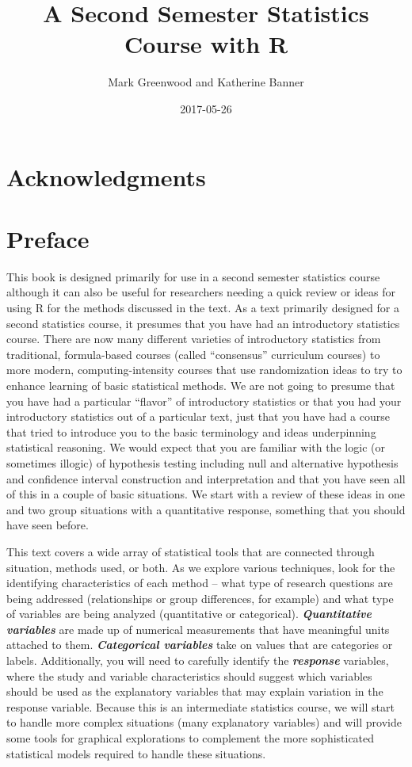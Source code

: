 \documentclass[]{book}
\title{A Second Semester Statistics Course with R}
\author{Mark Greenwood and Katherine Banner}
\date{2017-05-26}
\begin{document}
\maketitle

{
\setcounter{tocdepth}{1}
\tableofcontents
}
\chapter*{Acknowledgments}\label{acknowledgments}

\chapter{Preface}\label{preface}

This book is designed primarily for use in a second semester statistics
course although it can also be useful for researchers needing a quick
review or ideas for using R for the methods discussed in the text. As a
text primarily designed for a second statistics course, it presumes that
you have had an introductory statistics course. There are now many
different varieties of introductory statistics from traditional,
formula-based courses (called ``consensus'' curriculum courses) to more
modern, computing-intensity courses that use randomization ideas to try
to enhance learning of basic statistical methods. We are not going to
presume that you have had a particular ``flavor'' of introductory
statistics or that you had your introductory statistics out of a
particular text, just that you have had a course that tried to introduce
you to the basic terminology and ideas underpinning statistical
reasoning. We would expect that you are familiar with the logic (or
sometimes illogic) of hypothesis testing including null and alternative
hypothesis and confidence interval construction and interpretation and
that you have seen all of this in a couple of basic situations. We start
with a review of these ideas in one and two group situations with a
quantitative response, something that you should have seen before.

This text covers a wide array of statistical tools that are connected
through situation, methods used, or both. As we explore various
techniques, look for the identifying characteristics of each method --
what type of research questions are being addressed (relationships or
group differences, for example) and what type of variables are being
analyzed (quantitative or categorical). \textbf{\emph{Quantitative
variables}} are made up of numerical measurements that have meaningful
units attached to them. \textbf{\emph{Categorical variables}} take on
values that are categories or labels. Additionally, you will need to
carefully identify the \textbf{\emph{response}} variables, where the
study and variable characteristics should suggest which variables should
be used as the explanatory variables that may explain variation in the
response variable. Because this is an intermediate statistics course, we
will start to handle more complex situations (many explanatory
variables) and will provide some tools for graphical explorations to
complement the more sophisticated statistical models required to handle
these situations.
\end{document}
